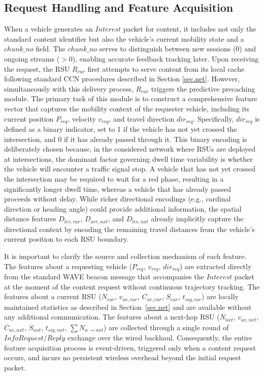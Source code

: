 \documentclass[journal]{IEEEtran}
\begin{document}
\subsection{Request Handling and Feature Acquisition}\label{subsec:1}
When a vehicle generates an \(Interest\) packet for content, it includes not only the standard content identifier but also the vehicle's current mobility state and a \(chunk\_no\) field.
The \(chunk\_no\) serves to distinguish between new sessions (0) and ongoing streams ($>0$), enabling accurate feedback tracking later.
Upon receiving the request, the RSU $R_{cur}$ first attempts to serve content from its local cache following standard CCN procedures described in Section \ref{sec.net}. 
However, simultaneously with this delivery process, $R_{cur}$ triggers the predictive precaching module.
The primary task of this module is to construct a comprehensive feature vector that captures the mobility context of the requester vehicle, including its current position $P_{req}$, velocity $v_{req}$, and travel direction $dir_{req}$.
Specifically, $dir_{req}$ is defined as a binary indicator, set to 1 if the vehicle has not yet crossed the intersection, and 0 if it has already passed through it.
This binary encoding is deliberately chosen because, in the considered network where RSUs are deployed at intersections, the dominant factor governing dwell time variability is whether the vehicle will encounter a traffic signal stop.
A vehicle that has not yet crossed the intersection may be required to wait for a red phase, resulting in a significantly longer dwell time, whereas a vehicle that has already passed proceeds without delay.
While richer directional encodings (e.g., cardinal direction or heading angle) could provide additional information, the spatial distance features $D_{lev,cur}$, $D_{arr,nxt}$, and $D_{lev,nxt}$ already implicitly capture the directional context by encoding the remaining travel distances from the vehicle's current position to each RSU boundary.

It is important to clarify the source and collection mechanism of each feature.
The features about a requesting vehicle ($P_{req}$, $v_{req}$, $dir_{req}$) are extracted directly from the standard WAVE beacon message that accompanies the \(Interest\) packet at the moment of the content request without continuous trajectory tracking.
The features about a current RSU ($N_{cur}$, $v_{av,cur}$, $C_{av,cur}$, $S_{cur}$, $t_{sig,cur}$) are locally maintained statistics as described in Section~\ref{sec.net} and are available without any additional communication.
The features about a next-hop RSU ($N_{nxt}$, $v_{av,nxt}$, $C_{av,nxt}$, $S_{nxt}$, $t_{sig,nxt}$, $\sum N_{n\rightarrow nxt}$) are collected through a single round of \(Info Request/Reply\) exchange over the wired backhaul.
Consequently, the entire feature acquisition process is event-driven, triggered only when a content request occurs, and incurs no persistent wireless overhead beyond the initial request packet.
\end{document}
